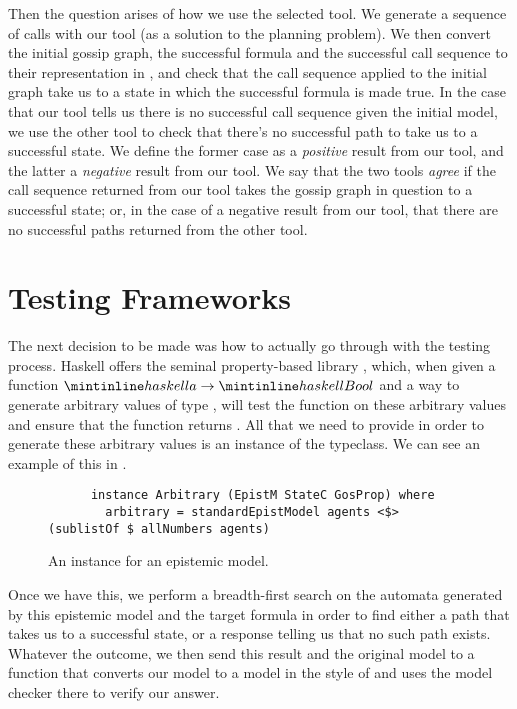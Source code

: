 \documentclass[10pt, a4paper]{report}
\begin{document}
Then the question arises of how we use the selected tool. We generate a sequence
of calls with our tool (as a solution to the planning problem). We then convert
the initial gossip graph, the successful formula and the successful call
sequence to their representation in \cite{GithubGossip}, and check that the call
sequence applied to the initial graph take us to a state in which the successful
formula is made true. In the case that our tool tells us there is no successful
call sequence given the initial model, we use the other tool to check that
there's no successful path to take us to a successful state. We define the
former case as a \emph{positive} result from our tool, and the latter a
\emph{negative} result from our tool. We say that the two tools \emph{agree} if
the call sequence returned from our tool takes the gossip graph in question to a
successful state; or, in the case of a negative result from our tool, that there
are no successful paths returned from the other tool.

\section{Testing Frameworks}
\label{sec:TestingFrameworks}

The next decision to be made was how to actually go through with the testing
process. Haskell offers the seminal property-based library ,
which, when given a function $\mih{a} \rightarrow \mih{Bool}$ and a way to
generate arbitrary values of type , will test the function on these
arbitrary values and ensure that the function returns . All that we need
to provide in order to generate these arbitrary values is an instance of the
 typeclass. We can see an example of this in .

\begin{figure}[h]
  \centering
  \begin{verbatim}
      instance Arbitrary (EpistM StateC GosProp) where
        arbitrary = standardEpistModel agents <$> (sublistOf $ allNumbers agents)
  \end{verbatim}
  \caption{An  instance for an epistemic model.}
  \label{fig:Arbitrary}
\end{figure}

Once we have this, we perform a breadth-first search on the automata generated
by this epistemic model and the target formula in order to find either a path
that takes us to a successful state, or a response telling us that no such path
exists. Whatever the outcome, we then send this result and the original model to
a function that converts our model to a model in the style of
\cite{GithubGossip} and uses the model checker there to verify our answer.
\end{document}
